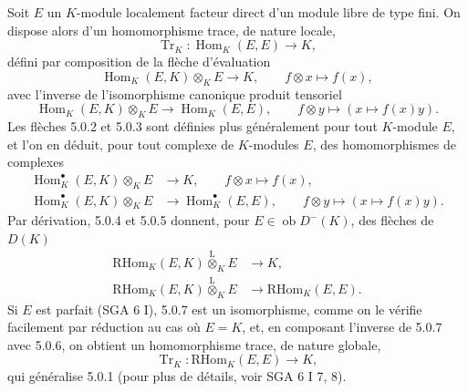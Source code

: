 \documentclass[11pt]{article}
\DeclareMathOperator{\Hom}{Hom}
\newcommand{\ob}{\operatorname{ob}}
\providecommand{\RHom}{\mathrm{RHom}}
\providecommand{\Tr}{\operatorname{Tr}}
\providecommand{\Tr}{\operatorname{Tr}}
\providecommand{\lten}{\overset{\mathrm L}{\otimes}}
\providecommand{\Tr}{\operatorname{Tr}}
\providecommand{\RHom}{\mathrm{RHom}}
\providecommand{\Hom}{\operatorname{Hom}}
\providecommand{\ob}{\operatorname{ob}}
\providecommand{\lten}{\overset{\mathrm L}{\otimes}}
\providecommand{\RHom}{\mathrm R\mathcal{H}om}
\providecommand{\lten}{\overset{\mathrm L}{\otimes}}
\providecommand{\Tr}{\operatorname{Tr}}
\providecommand{\lten}{\overset{\mathrm L}{\otimes}}
\providecommand{\lten}{\overset{\mathrm L}{\otimes}}
\providecommand{\lten}{\overset{\mathrm L}{\otimes}}
\providecommand{\RHom}{\mathrm{RHom}}
\providecommand{\Hom}{\operatorname{Hom}}
\providecommand{\Tr}{\operatorname{Tr}}
\providecommand{\lten}{\overset{\mathrm L}{\otimes}}
\begin{document}
Soit $E$ un $K$-module localement facteur direct d'un module libre de type fini. On dispose alors d'un homomorphisme trace, de nature locale,
\begin{equation}\tag{5.0.1}
\Tr_K:\Hom_K(E,E)\longrightarrow K,
\end{equation}
défini par composition de la flèche d'évaluation
\begin{equation}\tag{5.0.2}
\Hom_K(E,K)\otimes_KE\longrightarrow K,\qquad f\otimes x\longmapsto f(x),
\end{equation}
avec l'inverse de l'isomorphisme canonique produit tensoriel
\begin{equation}\tag{5.0.3}
\Hom_K(E,K)\otimes_KE\longrightarrow\Hom_K(E,E),\qquad f\otimes y\longmapsto (x\longmapsto f(x)y).
\end{equation}
Les flèches 5.0.2 et 5.0.3 sont définies plus généralement pour tout $K$-module $E$, et l'on en déduit, pour tout complexe de $K$-modules $E$, des homomorphismes de complexes
\begin{align}
\Hom_K^\bullet(E,K)\otimes_KE&\longrightarrow K,\qquad f\otimes x\longmapsto f(x),\tag{5.0.4}\\
\Hom_K^\bullet(E,K)\otimes_KE&\longrightarrow \Hom_K^\bullet(E,E),\qquad f\otimes y\longmapsto (x\longmapsto f(x)y).\tag{5.0.5}
\end{align}
Par dérivation, 5.0.4 et 5.0.5 donnent, pour $E\in\ob D^-(K)$, des flèches de $D(K)$
\begin{align}
\RHom_K(E,K)\lten_KE&\longrightarrow K,\tag{5.0.6}\\
\RHom_K(E,K)\lten_KE&\longrightarrow\RHom_K(E,E).\tag{5.0.7}
\end{align}
Si $E$ est parfait (SGA 6 I), 5.0.7 est un isomorphisme, comme on le vérifie facilement par réduction au cas où $E=K$, et, en composant l'inverse de 5.0.7 avec 5.0.6, on obtient un homomorphisme trace, de nature globale,
\begin{equation}\tag{5.0.8}
\Tr_K:\RHom_K(E,E)\longrightarrow K,
\end{equation}
qui généralise 5.0.1 (pour plus de détails, voir SGA 6 I 7, 8).
\end{document}
